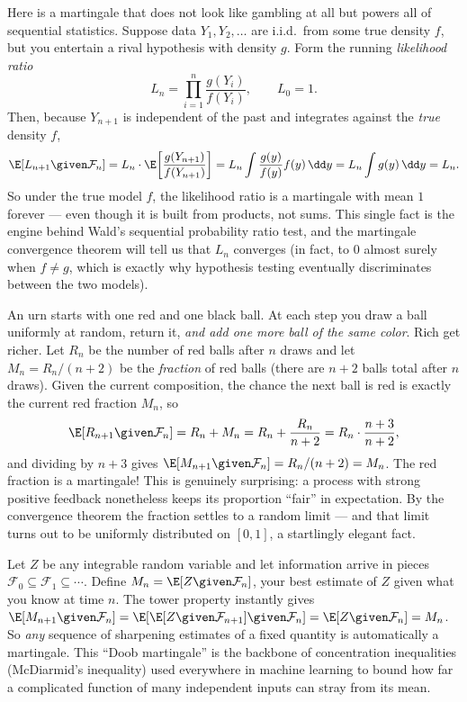 \begin{example}
\label{ch28:ex-lr}
Here is a martingale that does not look like gambling at all but powers all of sequential statistics.
Suppose data $Y_1, Y_2, \dots$ are i.i.d.\ from some true density $f$, but you entertain a rival
hypothesis with density $g$. Form the running \emph{likelihood ratio}
\[
  L_n = \prod_{i=1}^{n} \frac{g(Y_i)}{f(Y_i)}, \qquad L_0 = 1.
\]
Then, because $Y_{n+1}$ is independent of the past and integrates against the \emph{true} density $f$,
\[
  \E[L_{n+1}\given\mathcal{F}_n] = L_n \cdot \E\!\left[\frac{g(Y_{n+1})}{f(Y_{n+1})}\right]
  = L_n \int \frac{g(y)}{f(y)} f(y)\,\dd y = L_n \int g(y)\,\dd y = L_n.
\]
So under the true model $f$, the likelihood ratio is a martingale with mean $1$ forever --- even though
it is built from products, not sums. This single fact is the engine behind Wald's sequential
probability ratio test, and the martingale convergence theorem will tell us that $L_n$ converges (in
fact, to $0$ almost surely when $f \ne g$, which is exactly why hypothesis testing eventually
discriminates between the two models).
\end{example}

\begin{example}
\label{ch28:ex-polya}
An urn starts with one red and one black ball. At each step you draw a ball uniformly at random,
return it, \emph{and add one more ball of the same color}. Rich get richer. Let $R_n$ be the number of
red balls after $n$ draws and let $M_n = R_n / (n+2)$ be the \emph{fraction} of red balls (there are
$n+2$ balls total after $n$ draws). Given the current composition, the chance the next ball is red is
exactly the current red fraction $M_n$, so
\[
  \E[R_{n+1}\given\mathcal{F}_n] = R_n + M_n = R_n + \frac{R_n}{n+2} = R_n \cdot \frac{n+3}{n+2},
\]
and dividing by $n+3$ gives $\E[M_{n+1}\given\mathcal{F}_n] = R_n/(n+2) = M_n$. The red fraction is a
martingale! This is genuinely surprising: a process with strong positive feedback nonetheless keeps its
proportion ``fair'' in expectation. By the convergence theorem the fraction settles to a random limit
--- and that limit turns out to be uniformly distributed on $[0,1]$, a startlingly elegant fact.
\end{example}

\begin{example}
\label{ch28:ex-doob}
Let $Z$ be any integrable random variable and let information arrive in pieces $\mathcal{F}_0 \subseteq
\mathcal{F}_1 \subseteq \cdots$. Define $M_n = \E[Z \given \mathcal{F}_n]$, your best estimate of $Z$
given what you know at time $n$. The tower property instantly gives
$\E[M_{n+1}\given\mathcal{F}_n] = \E[\E[Z\given\mathcal{F}_{n+1}]\given\mathcal{F}_n]
= \E[Z\given\mathcal{F}_n] = M_n$. So \emph{any} sequence of sharpening estimates of a fixed quantity
is automatically a martingale. This ``Doob martingale'' is the backbone of concentration inequalities
(McDiarmid's inequality) used everywhere in machine learning to bound how far a complicated function of
many independent inputs can stray from its mean.
\end{example}

